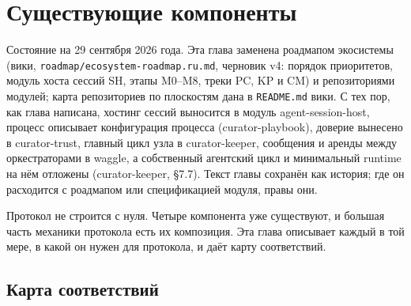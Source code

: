 \chapter{Существующие компоненты}

\begin{warnbox}
Состояние на 29 сентября 2026 года. Эта глава заменена роадмапом экосистемы (вики, \texttt{roadmap/ecosystem-roadmap.ru.md}, черновик v4: порядок приоритетов, модуль хоста сессий SH, этапы M0--M8, треки PC, KP и CM) и репозиториями модулей; карта репозиториев по плоскостям дана в \texttt{README.md} вики. С тех пор, как глава написана, хостинг сессий выносится в модуль agent-session-host, процесс описывает конфигурация процесса (curator-playbook), доверие вынесено в curator-trust, главный цикл узла в curator-keeper, сообщения и аренды между оркестраторами в waggle, а собственный агентский цикл и минимальный runtime на нём отложены (curator-keeper, §7.7). Текст главы сохранён как история; где он расходится с роадмапом или спецификацией модуля, правы они.
\end{warnbox}

Протокол не строится с нуля. Четыре компонента уже существуют, и большая часть механики протокола есть их композиция. Эта глава описывает каждый в той мере, в какой он нужен для протокола, и даёт карту соответствий.

\section{Карта соответствий}

